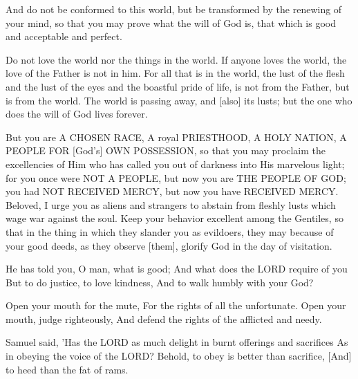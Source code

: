 \begin{scripture}[Romans 12:2]
    And do not be conformed to this world, but be transformed by the renewing of your mind, so that you may prove what the will of God is, that which is good and acceptable and perfect.
\end{scripture}

\begin{scripture}[1 John 2:15-17]
    Do not love the world nor the things in the world. If anyone loves the world, the love of the Father is not in him.
    For all that is in the world, the lust of the flesh and the lust of the eyes and the boastful pride of life, is not from the Father, but is from the world.
    The world is passing away, and [also] its lusts; but the one who does the will of God lives forever.
\end{scripture}

\begin{scripture}[1 Peter 2:9-12]
    But you are A CHOSEN RACE, A royal PRIESTHOOD, A HOLY NATION, A PEOPLE FOR [God's] OWN POSSESSION, so that you may proclaim the excellencies of Him who has called you out of darkness into His marvelous light;
    for you once were NOT A PEOPLE, but now you are THE PEOPLE OF GOD; you had NOT RECEIVED MERCY, but now you have RECEIVED MERCY.
    Beloved, I urge you as aliens and strangers to abstain from fleshly lusts which wage war against the soul.
    Keep your behavior excellent among the Gentiles, so that in the thing in which they slander you as evildoers, they may because of your good deeds, as they observe [them], glorify God in the day of visitation.
\end{scripture}

\begin{scripture}[Micah 6:8]
    He has told you, O man, what is good; And what does the LORD require of you But to do justice, to love kindness, And to walk humbly with your God?
\end{scripture}

\begin{scripture}[Proverbs 31:8-9]
    Open your mouth for the mute, For the rights of all the unfortunate.
    Open your mouth, judge righteously, And defend the rights of the afflicted and needy.
\end{scripture}

\begin{scripture}[1 Samuel 15:22]
    Samuel said, 'Has the LORD as much delight in burnt offerings and sacrifices As in obeying the voice of the LORD? Behold, to obey is better than sacrifice, [And] to heed than the fat of rams.
\end{scripture}


